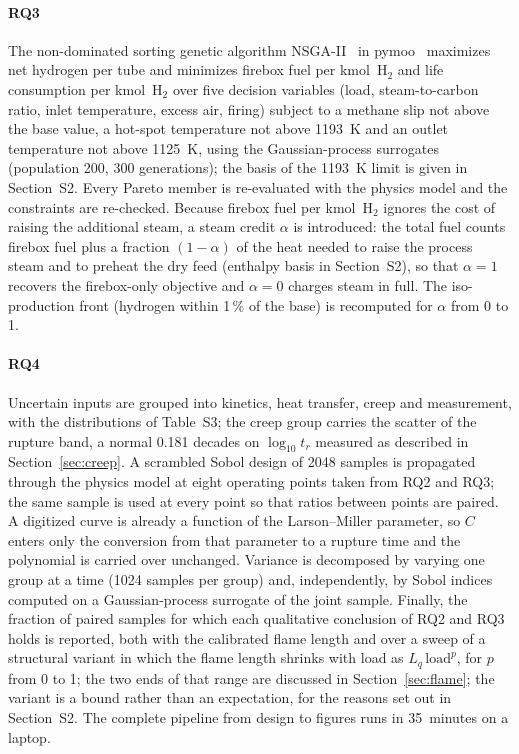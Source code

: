 \documentclass[final,3p,times]{elsarticle}
\begin{document}
\paragraph{RQ3} The non-dominated sorting genetic algorithm NSGA-II~\cite{deb2002} in pymoo~\cite{pymoo} maximizes net hydrogen per tube and minimizes firebox fuel per kmol~H$_2$ and life consumption per kmol~H$_2$ over five decision variables (load, steam-to-carbon ratio, inlet temperature, excess air, firing) subject to a methane slip not above the base value, a hot-spot temperature not above 1193~K and an outlet temperature not above 1125~K, using the Gaussian-process surrogates (population 200, 300 generations); the basis of the 1193~K limit is given in Section~S2. Every Pareto member is re-evaluated with the physics model and the constraints are re-checked. Because firebox fuel per kmol~H$_2$ ignores the cost of raising the additional steam, a steam credit $\alpha$ is introduced: the total fuel counts firebox fuel plus a fraction $(1-\alpha)$ of the heat needed to raise the process steam and to preheat the dry feed (enthalpy basis in Section~S2), so that $\alpha = 1$ recovers the firebox-only objective and $\alpha = 0$ charges steam in full. The iso-production front (hydrogen within 1\,\% of the base) is recomputed for $\alpha$ from 0 to 1.

\paragraph{RQ4} Uncertain inputs are grouped into kinetics, heat transfer, creep and measurement, with the distributions of Table~S3; the creep group carries the scatter of the rupture band, a normal 0.181 decades on $\log_{10} t_r$ measured as described in Section~\ref{sec:creep}. A scrambled Sobol design of 2048 samples is propagated through the physics model at eight operating points taken from RQ2 and RQ3; the same sample is used at every point so that ratios between points are paired. A digitized curve is already a function of the Larson--Miller parameter, so $C$ enters only the conversion from that parameter to a rupture time and the polynomial is carried over unchanged. Variance is decomposed by varying one group at a time (1024 samples per group) and, independently, by Sobol indices computed on a Gaussian-process surrogate of the joint sample. Finally, the fraction of paired samples for which each qualitative conclusion of RQ2 and RQ3 holds is reported, both with the calibrated flame length and over a sweep of a structural variant in which the flame length shrinks with load as $L_q\,\mathrm{load}^{p}$, for $p$ from 0 to 1; the two ends of that range are discussed in Section~\ref{sec:flame}; the variant is a bound rather than an expectation, for the reasons set out in Section~S2. The complete pipeline from design to figures runs in 35~minutes on a laptop.
\end{document}
